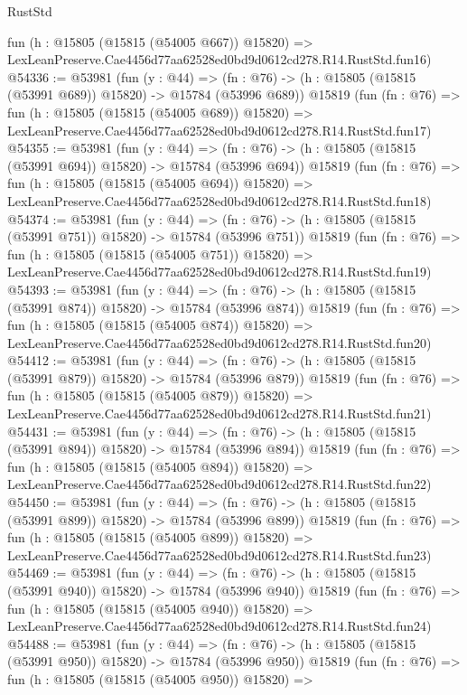 \begin{lexlean}{RustStd}
\begin{coremodule}
    fun (h : @15805 (@15815 (@54005 @667)) @15820) =>
    LexLeanPreserve.Cae4456d77aa62528ed0bd9d0612cd278.R14.RustStd.fun16)
@54336 := @53981
    (fun (y : @44) =>
    (fn : @76) -> (h : @15805 (@15815 (@53991 @689)) @15820) -> @15784 (@53996 @689))
    @15819
    (fun (fn : @76) =>
    fun (h : @15805 (@15815 (@54005 @689)) @15820) =>
    LexLeanPreserve.Cae4456d77aa62528ed0bd9d0612cd278.R14.RustStd.fun17)
@54355 := @53981
    (fun (y : @44) =>
    (fn : @76) -> (h : @15805 (@15815 (@53991 @694)) @15820) -> @15784 (@53996 @694))
    @15819
    (fun (fn : @76) =>
    fun (h : @15805 (@15815 (@54005 @694)) @15820) =>
    LexLeanPreserve.Cae4456d77aa62528ed0bd9d0612cd278.R14.RustStd.fun18)
@54374 := @53981
    (fun (y : @44) =>
    (fn : @76) -> (h : @15805 (@15815 (@53991 @751)) @15820) -> @15784 (@53996 @751))
    @15819
    (fun (fn : @76) =>
    fun (h : @15805 (@15815 (@54005 @751)) @15820) =>
    LexLeanPreserve.Cae4456d77aa62528ed0bd9d0612cd278.R14.RustStd.fun19)
@54393 := @53981
    (fun (y : @44) =>
    (fn : @76) -> (h : @15805 (@15815 (@53991 @874)) @15820) -> @15784 (@53996 @874))
    @15819
    (fun (fn : @76) =>
    fun (h : @15805 (@15815 (@54005 @874)) @15820) =>
    LexLeanPreserve.Cae4456d77aa62528ed0bd9d0612cd278.R14.RustStd.fun20)
@54412 := @53981
    (fun (y : @44) =>
    (fn : @76) -> (h : @15805 (@15815 (@53991 @879)) @15820) -> @15784 (@53996 @879))
    @15819
    (fun (fn : @76) =>
    fun (h : @15805 (@15815 (@54005 @879)) @15820) =>
    LexLeanPreserve.Cae4456d77aa62528ed0bd9d0612cd278.R14.RustStd.fun21)
@54431 := @53981
    (fun (y : @44) =>
    (fn : @76) -> (h : @15805 (@15815 (@53991 @894)) @15820) -> @15784 (@53996 @894))
    @15819
    (fun (fn : @76) =>
    fun (h : @15805 (@15815 (@54005 @894)) @15820) =>
    LexLeanPreserve.Cae4456d77aa62528ed0bd9d0612cd278.R14.RustStd.fun22)
@54450 := @53981
    (fun (y : @44) =>
    (fn : @76) -> (h : @15805 (@15815 (@53991 @899)) @15820) -> @15784 (@53996 @899))
    @15819
    (fun (fn : @76) =>
    fun (h : @15805 (@15815 (@54005 @899)) @15820) =>
    LexLeanPreserve.Cae4456d77aa62528ed0bd9d0612cd278.R14.RustStd.fun23)
@54469 := @53981
    (fun (y : @44) =>
    (fn : @76) -> (h : @15805 (@15815 (@53991 @940)) @15820) -> @15784 (@53996 @940))
    @15819
    (fun (fn : @76) =>
    fun (h : @15805 (@15815 (@54005 @940)) @15820) =>
    LexLeanPreserve.Cae4456d77aa62528ed0bd9d0612cd278.R14.RustStd.fun24)
@54488 := @53981
    (fun (y : @44) =>
    (fn : @76) -> (h : @15805 (@15815 (@53991 @950)) @15820) -> @15784 (@53996 @950))
    @15819
    (fun (fn : @76) =>
    fun (h : @15805 (@15815 (@54005 @950)) @15820) =>

\end{coremodule}
\end{lexlean}

